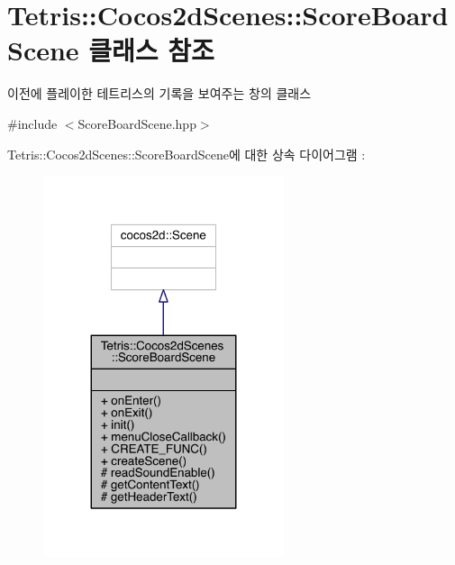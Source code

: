 \hypertarget{class_tetris_1_1_cocos2d_scenes_1_1_score_board_scene}{}\section{Tetris\+:\+:Cocos2d\+Scenes\+:\+:Score\+Board\+Scene 클래스 참조}
\label{class_tetris_1_1_cocos2d_scenes_1_1_score_board_scene}


이전에 플레이한 테트리스의 기록을 보여주는 창의 클래스  




{\ttfamily \#include $<$Score\+Board\+Scene.\+hpp$>$}



Tetris\+:\+:Cocos2d\+Scenes\+:\+:Score\+Board\+Scene에 대한 상속 다이어그램 \+: 
\nopagebreak
\begin{figure}[H]
\begin{center}
\leavevmode
\includegraphics[width=200pt]{d1/d05/class_tetris_1_1_cocos2d_scenes_1_1_score_board_scene__inherit__graph}
\end{center}
\end{figure}


